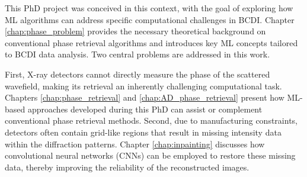 This PhD project was conceived in this context, with the goal of exploring how ML algorithms can address specific 
computational challenges in BCDI. Chapter \ref{chap:phase_problem} provides the necessary theoretical background on 
conventional phase retrieval algorithms and introduces key ML concepts tailored to BCDI data analysis. Two central 
problems are addressed in this work.

First, X-ray detectors cannot directly measure the phase of the scattered wavefield, making its retrieval an inherently 
challenging computational task. Chapters \ref{chap:phase_retrieval} and \ref{chap:AD_phase_retrieval} present how ML-based 
approaches developed during this PhD can assist or complement conventional phase retrieval methods. Second, due to manufacturing 
constraints, detectors often contain grid-like regions that result in missing intensity data within the diffraction patterns. 
Chapter \ref{chap:inpainting} discusses how convolutional neural networks (CNNs) can be employed to restore these missing data, 
thereby improving the reliability of the reconstructed images.


